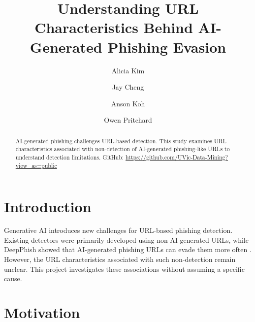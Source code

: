 \documentclass[sigconf]{acmart}
\begin{document}
\begin{bibunit}
\title{Understanding URL Characteristics Behind AI-Generated Phishing Evasion }
\author{Alicia Kim}
\author{Jay Cheng}
\author{Anson Koh}

\author{Owen Pritchard}

\begin{abstract}
AI-generated phishing challenges URL-based detection. This study examines URL characteristics associated with non-detection of AI-generated phishing-like URLs to understand detection limitations. GitHub: \url{https://github.com/UVic-Data-Mining?view_as=public}
\end{abstract}


\maketitle

\section{Introduction}

Generative AI introduces new challenges for URL-based phishing detection. Existing detectors were primarily developed using non-AI-generated URLs, while DeepPhish showed that AI-generated phishing URLs can evade them more often \cite{bahnsen2018deepphish}. However, the URL characteristics associated with such non-detection remain unclear. This project investigates these associations without assuming a specific cause.

\section{Motivation}


\end{bibunit}
\end{document}
